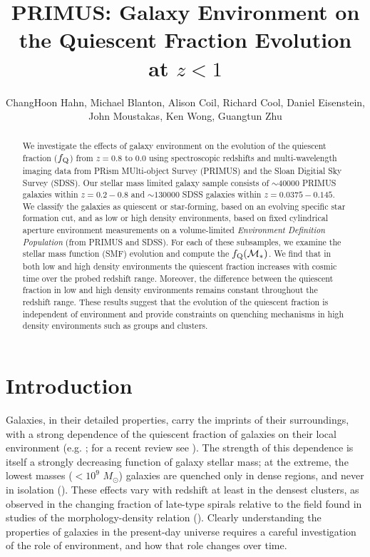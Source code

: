 \documentclass{emulateapj}
\begin{document}
\title{PRIMUS: Galaxy Environment on the Quiescent Fraction Evolution at $z < 1$}
\author{ChangHoon Hahn, Michael Blanton, Alison Coil, Richard Cool, Daniel Eisenstein, John Moustakas, Ken Wong, Guangtun Zhu}

\begin{abstract}
We investigate the effects of galaxy environment on the evolution of the quiescent fraction ($f_{\rm{Q}}$) from $z =0.8 $ to $ 0.0$ using spectroscopic redshifts and multi-wavelength imaging data from PRism MUlti-object Survey (PRIMUS) and the Sloan Digitial Sky Survey (SDSS). Our stellar mass limited galaxy sample consists of $\sim 40000$ PRIMUS galaxies within $z = 0.2-0.8$ and $\sim 130000$ SDSS galaxies within $z = 0.0375-0.145$. We classify the galaxies as quiescent or star-forming, based on an evolving specific star formation cut, and as low or high density environments, based on fixed cylindrical aperture environment measurements on a volume-limited {\em Environment Definition Population} (from PRIMUS and SDSS). For each of these subsamples, we examine the stellar mass function (SMF) evolution and compute the $f_{\rm{Q}}(\mathcal{M}_{*})$. We find that in both low and high density environments the quiescent fraction increases with cosmic time over the probed redshift range. Moreover, the difference between the quiescent fraction in low and high density environments remains constant throughout the redshift range. These results suggest that the evolution of the quiescent fraction is independent of environment and provide constraints on quenching mechanisms in high density environments such as groups and clusters.  
\end{abstract}

\section{Introduction}
Galaxies, in their detailed properties, carry the imprints of their
surroundings, with a strong dependence of the quiescent fraction of
galaxies on their local environment (e.g. \citealt{hubble36a,
oemler74a, dressler80a, hermit96a, guzzo97a}; for a recent review see
\citealt{blanton09a}).  The strength of this dependence is itself a
strongly decreasing function of galaxy stellar mass; at the extreme,
the lowest masses ($<10^{9}$ $M_\odot$) galaxies are quenched only in
dense regions, and never in isolation (\citealt{geha12a}).  These
effects vary with redshift at least in the densest clusters, as
observed in the changing fraction of late-type spirals relative to the
field found in studies of the morphology-density relation
(\citealt{dressler84a, desai07a}).  Clearly understanding the
properties of galaxies in the present-day universe requires a careful
investigation of the role of environment, and how that role changes
over time.
\end{document}
